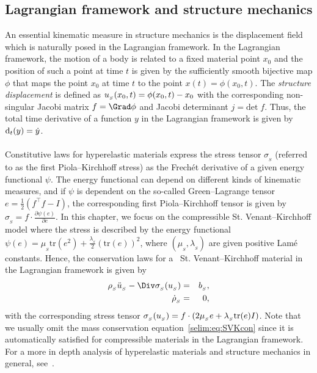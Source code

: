 \subsection{ Lagrangian framework and structure mechanics}

An essential kinematic measure in structure mechanics is the
displacement field which is naturally posed in the Lagrangian
framework.  In the Lagrangian framework, the motion of a body is
related to a fixed material point $x_0$ and the position of
such a point at time $t$ is given by the sufficiently smooth bijective
map $\phi$ that maps the point $x_0$ at time $t$ to the point $x(t)=
\phi(x_0,t)$. The \emph{structure displacement} is defined as
$u_{_{S}}(x_0,t) = \phi(x_0, t) - x_0$ with the corresponding non-singular
Jacobi matrix $f = \Grad\phi$ and Jacobi determinant $j =
\textrm{det}\; f$. Thus, the total time derivative of a function $y$
in the Lagrangian framework is given by $\textrm{d}_t(y) = \dot{y}$.
\\\\
Constitutive laws for hyperelastic materials express the stress
tensor $\sigma_{_{S}}$ (referred to as the first Piola--Kirchhoff
stress) as the Frech\'{e}t derivative of a given energy functional
$\psi$.  The energy functional can depend on different kinds of
kinematic measures, and if $\psi$ is dependent on the so-called
Green--Lagrange tensor $e= \tfrac{1}{2}(f^{\top}f -I)$, the corresponding first
Piola--Kirchhoff tensor is given by $\sigma_{_{S}} =
f\cdot\frac{\partial \psi(e)}{\partial e}$. In this chapter, we focus
on the compressible St. Venant--Kirchhoff model where the stress is
described by the energy functional $\psi(e) =
\mu_{_{S}}\textrm{tr}(e^2) +
\frac{\lambda_{_{S}}}{2}(\textrm{tr}(e))^2$, where
$(\mu_{_{S}},\lambda_{_{S}})$ are given positive Lam\'{e}
constants. Hence, the conservation laws for a ~St. Venant--Kirchhoff
material in the Lagrangian framework is given by
\begin{eqnarray}
\label{selim:eq:SVKmom}
\rhoS \ddotuS - \Div\sigmaS(\uS) &=& b_{_{S}}, \\
\label{selim:eq:SVKcon}
\dot{\rho}_{_{S}}&=&0,
\end{eqnarray}
with the corresponding stress tensor $\sigma_{_{S}}(u_{_{S}}) =
f\cdot(2\mu_{_{S}}e + \lambda_{_{S}} \textrm{tr}(e)I)$.  Note that we
usually omit the mass conservation equation~\eqref{selim:eq:SVKcon}
since it is automatically satisfied for compressible materials in the
Lagrangian framework.  For a more in depth analysis of hyperelastic
materials and structure mechanics in general, see~\cite{Gurtin1981,
  Holzapfel2000, Narayanan2007}.

